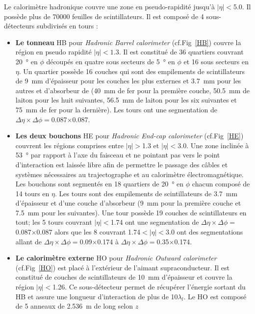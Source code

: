 Le calorimètre hadronique couvre une zone en pseudo-rapidité jusqu'à $|\eta|<$\num{5.0}. Il possède plus de \num{70000} feuilles de scintillateurs. Il est composé de \num{4} sous-détecteurs subdivisés en tours : 
\begin{itemize}[label=$\bullet$]
	\item \textbf{Le tonneau} HB pour \textit{Hadronic Barrel calorimeter} (cf.Fig~\ref{HB}) couvre la région en pseudo rapidité $|\eta|<1.3$. Il est constitué de \num{36} quartiers couvrant \SI{20}{\degree} en $\phi$ découpés en quatre sous secteurs de \SI{5}{\degree} en $\phi$ et \num{16} sous secteurs en $\eta$. Un quartier possède \num{16} couches qui sont des empilements de scintillateurs de \SI{9}{\milli\meter} d'épaisseur pour les couches les plus externes et \SI{3.7}{\milli\meter} pour les autres et d'absorbeur de (\SI{40}{\milli\meter} de fer pour la première couche, \SI{50.5}{\milli\meter} de laiton pour les huit suivantes, \SI{56.5}{\milli\meter} de laiton pour les six suivantes et \SI{75}{\milli\meter} de fer pour la dernière). Les tours ont une segmentation de $\Delta\eta\times\Delta\phi=$\num{0.087}$\times$\num{0.087}.
	\item \textbf{Les deux bouchons} HE pour \textit{Hadronic End-cap calorimeter} (cf.Fig~\ref{HE}) couvrent les régions comprises entre $|\eta|>$\num{1.3} et $|\eta|<$\num{3.0}. Une zone inclinée à \SI{53}{\degree} par rapport à l'axe du faisceau et ne pointant pas vers le point d'interaction est laissée libre afin de permettre le passage des câbles et systèmes nécessaires au trajectographe et au calorimètre électromagnétique. Les bouchons sont segmentés en \num{18} quartiers de \SI{20}{\degree} en $\phi$ chacun composé de \num{14} tours en $\eta$. Les tours sont des empilements de scintillateurs de \SI{3.7}{\milli\meter} d'épaisseur et d'une couche d'absorbeur (\SI{9}{\milli\meter} pour la première couche et \SI{7.5}{\milli\meter} pour les suivantes). Une tour possède \num{19} couches de  scintillateurs en tout; les \num{5} tours couvrant $|\eta|<$\num{1.74} ont une segmentation de $\Delta\eta\times\Delta\phi=$\num{0.087}$\times$\num{0.087} alors que les \num{8} couvrant \num{1.74}$<|\eta|<$\num{3.0} ont des segmentations allant de $\Delta\eta\times\Delta\phi=$\num{0.09}$\times$\num{0.174} à $\Delta\eta\times\Delta\phi=$\num{0.35}$\times$\num{0.174}.
	\item \textbf{Le calorimètre externe} HO pour \textit{Hadronic Outward calorimeter} (cf.Fig~\ref{HO}) est placé à l'extérieur de l'aimant supraconducteur. Il est constitué de couches de scintillateurs de \SI{10}{\milli\meter} d'épaisseur et couvre la région $|\eta|<$\num{1.26}. Ce sous-détecteur permet de récupérer l'énergie sortant du HB et assure une longueur d'interaction de plus de \num{10}$\lambda_{l}$. Le HO est composé de \num{5} anneaux de \SI{2.536}{\meter} de long selon $z$ 

\end{itemize}
